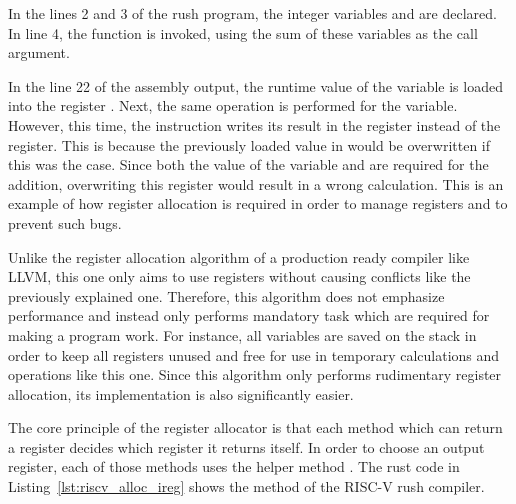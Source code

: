 In the lines 2 and 3 of the rush program, the integer variables  and  are declared.
In line 4, the  function is invoked, using the sum of these variables as the call argument.

In the line 22 of the assembly output, the runtime value of the  variable is loaded into the register .
Next, the same operation is performed for the  variable.
However, this time, the instruction writes its result in the  register instead of the  register.
This is because the previously loaded value in  would be overwritten if this was the case.
Since both the value of the variable  and  are required for the addition, overwriting this register would result in a wrong calculation.
This is an example of how register allocation is required in order to manage registers and to prevent such bugs.

Unlike the register allocation algorithm of a production ready compiler like LLVM, this one only aims to use registers without causing conflicts like the previously explained one.
Therefore, this algorithm does not emphasize performance and instead only performs mandatory task which are required for making a program work.
For instance, all variables are saved on the stack in order to keep all registers unused and free for use in temporary calculations and operations like this one.
Since this algorithm only performs rudimentary register allocation, its implementation is also significantly easier.

The core principle of the register allocator is that each method which can return a register decides which register it returns itself.
In order to choose an output register, each of those methods uses the helper method .
The rust code in Listing~\ref{lst:riscv_alloc_ireg} shows the  method of the RISC-V rush compiler.


